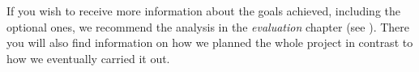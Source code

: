 If you wish to receive more information about the goals achieved, including the optional ones, we recommend the analysis in the \textit{evaluation} chapter (see ). There you will also find information on how we planned the whole project in contrast to how we eventually carried it out.





















